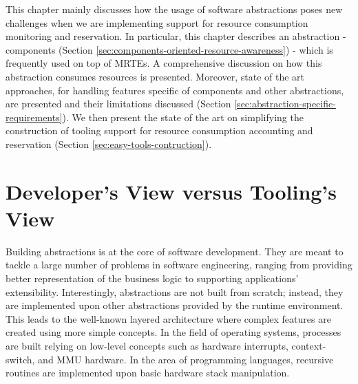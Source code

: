 This chapter mainly discusses how the usage of software abstractions poses new challenges when we are implementing support for resource consumption monitoring and reservation.
In particular, this chapter describes an abstraction - components (Section \ref{sec:components-oriented-resource-awareness}) - which is frequently used on top of MRTEs.
A comprehensive discussion on how this abstraction consumes resources is presented.
Moreover, state of the art approaches, for handling features specific of components and other abstractions, are presented and their limitations discussed (Section \ref{sec:abstraction-specific-requirements}).
We then present the state of the art on simplifying the construction of tooling support for resource consumption accounting and reservation (Section \ref{sec:easy-tools-contruction}).

\section{Developer's View versus Tooling's View} \label{sec:chapter2-introduction}

Building abstractions is at the core of software development.
They are meant to tackle a large number of problems in software engineering, ranging from providing better representation of the business logic to supporting applications' extensibility.
Interestingly, abstractions are not built from scratch; instead, they are implemented upon other abstractions provided by the runtime environment.
This leads to the well-known layered architecture where complex features are created using more simple concepts.
In the field of operating systems, processes are built relying on low-level concepts such as hardware interrupts, context-switch, and MMU hardware.
In the area of programming languages, recursive routines are implemented upon basic hardware stack manipulation.

